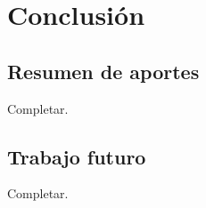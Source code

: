 \chapter{Conclusi\'on}\label{conclussions}

\section{Resumen de aportes}

Completar.

\section{Trabajo futuro}

Completar.